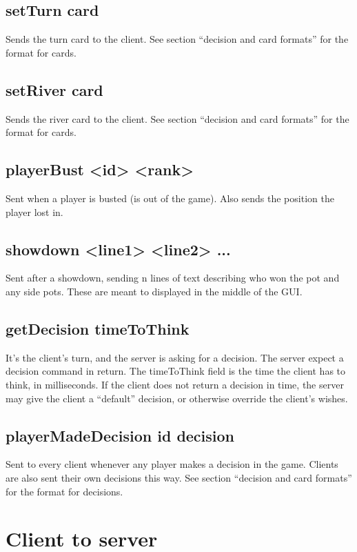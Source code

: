 \documentclass{article}
\begin{document}
\subsection*{setTurn \textlangle{}card\textrangle{}}
Sends the turn card to the client. See section ``decision and card formats'' for the format for cards.

\subsection*{setRiver \textlangle{}card\textrangle{}}
Sends the river card to the client. See section ``decision and card formats'' for the format for cards.

\subsection{playerBust <id> <rank>}
Sent when a player is busted (is out of the game). Also sends the position the player lost in.

\subsection{showdown <line1> <line2> ... }
Sent after a showdown, sending n lines of text describing who won the pot and any side pots. These are meant to displayed in the middle of the GUI.

\subsection*{getDecision \textlangle{}timeToThink\textrangle{}}
It's the client's turn, and the server is asking for a decision. The server expect a decision command in return. The timeToThink field is the time the client has to think, in milliseconds. If the client does not return a decision in time, the server may give the client a ``default'' decision, or otherwise override the client's wishes.

\subsection*{playerMadeDecision \textlangle{}id\textrangle{} \textlangle{}decision\textrangle{}}
Sent to every client whenever any player makes a decision in the game. Clients are also sent their own decisions this way. See section ``decision and card formats'' for the format for decisions.

\section{Client to server}
\end{document}
